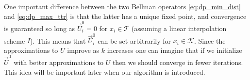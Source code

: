 \documentclass{journal}
\newcommand{\D}{\mathcal{D}}
\newcommand{\K}{\mathcal{K}}
\newcommand{\T}{\mathcal{T}}
\newcommand{\U}{\mathcal{U}}
\newcommand{\RR}{\mathbb{R}}
\newcommand{\optud}{\underset{u\in\U}{\max}\text{ }\underset{ d\in\D}{\min}}
\begin{document}
One important difference between the two Bellman operators \ref{eq:dp_min_dist} and \ref{eq:dp_max_ttr} is that the latter has a unique fixed point, and convergence is guaranteed so long as $\vec{U}_i^0 =0$ for $x_i \in \T$ (assuming a linear interpolation scheme $I$). This means that $\vec{U}_i^0$ can be set arbitrarily for $x_i \in \K$. Since the approximations to $U$ improve as $k$ increases one can imagine that if we initialize $\vec{U}^0$ with better approximations to $U$ then we should converge in fewer iterations. This idea will be important later when our algorithm is introduced. 

%
%
\end{document}
